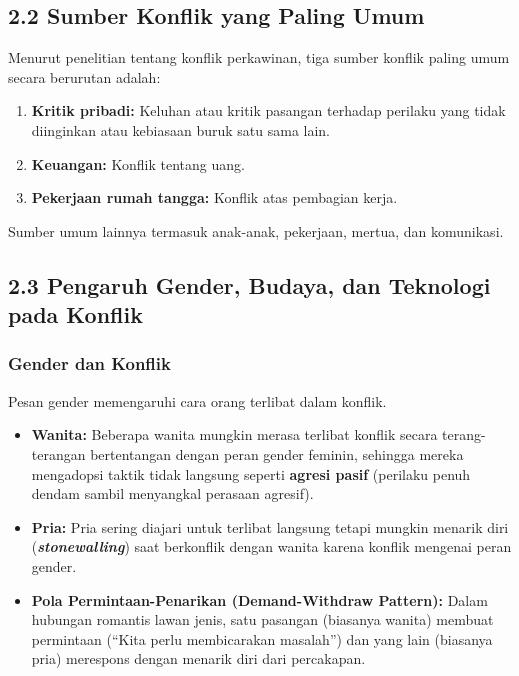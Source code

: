 \documentclass[
  letterpaper,
  DIV=11,
  numbers=noendperiod]{scrreprt}
\providecommand{\tightlist}{%
  \setlength{\itemsep}{0pt}\setlength{\parskip}{0pt}}
\begin{document}
\subsection{2.2 Sumber Konflik yang Paling
Umum}\label{sumber-konflik-yang-paling-umum}

Menurut penelitian tentang konflik perkawinan, tiga sumber konflik
paling umum secara berurutan adalah:

\begin{enumerate}
\def\labelenumi{\arabic{enumi}.}
\tightlist
\item
  \textbf{Kritik pribadi:} Keluhan atau kritik pasangan terhadap
  perilaku yang tidak diinginkan atau kebiasaan buruk satu sama lain.
\item
  \textbf{Keuangan:} Konflik tentang uang.
\item
  \textbf{Pekerjaan rumah tangga:} Konflik atas pembagian kerja.
\end{enumerate}

Sumber umum lainnya termasuk anak-anak, pekerjaan, mertua, dan
komunikasi.

\subsection{2.3 Pengaruh Gender, Budaya, dan Teknologi pada
Konflik}\label{pengaruh-gender-budaya-dan-teknologi-pada-konflik}

\subsubsection{Gender dan Konflik}\label{gender-dan-konflik}

Pesan gender memengaruhi cara orang terlibat dalam konflik.

\begin{itemize}
\tightlist
\item
  \textbf{Wanita:} Beberapa wanita mungkin merasa terlibat konflik
  secara terang-terangan bertentangan dengan peran gender feminin,
  sehingga mereka mengadopsi taktik tidak langsung seperti
  \textbf{agresi pasif} (perilaku penuh dendam sambil menyangkal
  perasaan agresif).
\item
  \textbf{Pria:} Pria sering diajari untuk terlibat langsung tetapi
  mungkin menarik diri (\textbf{\emph{stonewalling}}) saat berkonflik
  dengan wanita karena konflik mengenai peran gender.
\item
  \textbf{Pola Permintaan-Penarikan (Demand-Withdraw Pattern):} Dalam
  hubungan romantis lawan jenis, satu pasangan (biasanya wanita) membuat
  permintaan (``Kita perlu membicarakan masalah'') dan yang lain
  (biasanya pria) merespons dengan menarik diri dari percakapan.
\end{itemize}
\end{document}
